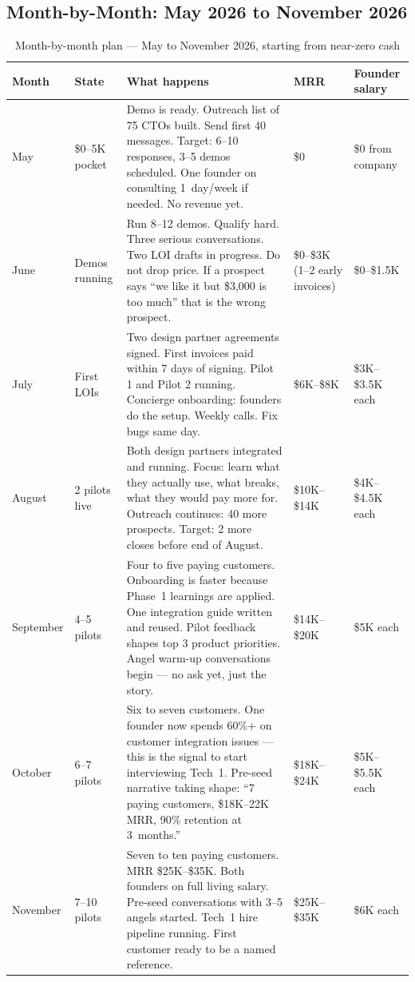 \subsection*{Month-by-Month: May 2026 to November 2026}

\begin{table}[H]
\centering
\renewcommand{\arraystretch}{1.7}
\begin{tabularx}{\textwidth}{@{}llXll@{}}
\toprule
\textbf{Month} & \textbf{State} & \textbf{What happens} &
\textbf{MRR} & \textbf{Founder salary} \\
\midrule
May & \$0--5K pocket & Demo is ready. Outreach list of 75 CTOs built.
  Send first 40 messages. Target: 6--10 responses, 3--5 demos
  scheduled. One founder on consulting 1~day/week if needed.
  No revenue yet. & \$0 & \$0 from company \\
\midrule
June & Demos running & Run 8--12 demos. Qualify hard. Three serious
  conversations. Two LOI drafts in progress. Do not drop price.
  If a prospect says ``we like it but \$3,000 is too much''
  that is the wrong prospect. & \$0--\$3K
  (1--2 early invoices) & \$0--\$1.5K \\
\midrule
July & First LOIs & Two design partner agreements signed. First
  invoices paid within 7 days of signing. Pilot 1 and Pilot 2
  running. Concierge onboarding: founders do the setup. Weekly
  calls. Fix bugs same day. & \$6K--\$8K & \$3K--\$3.5K each \\
\midrule
August & 2 pilots live & Both design partners integrated and running.
  Focus: learn what they actually use, what breaks, what they
  would pay more for. Outreach continues: 40 more prospects.
  Target: 2 more closes before end of August. & \$10K--\$14K &
  \$4K--\$4.5K each \\
\midrule
September & 4--5 pilots & Four to five paying customers. Onboarding
  is faster because Phase~1 learnings are applied. One integration
  guide written and reused. Pilot feedback shapes top 3 product
  priorities. Angel warm-up conversations begin --- no ask yet,
  just the story. & \$14K--\$20K & \$5K each \\
\midrule
October & 6--7 pilots & Six to seven customers. One founder now spends
  60\%+ on customer integration issues --- this is the signal to
  start interviewing Tech~1. Pre-seed narrative taking shape:
  ``7 paying customers, \$18K--22K MRR, 90\% retention at
  3~months.'' & \$18K--\$24K & \$5K--\$5.5K each \\
\midrule
November & 7--10 pilots & Seven to ten paying customers. MRR
  \$25K--\$35K. Both founders on full living salary. Pre-seed
  conversations with 3--5 angels started. Tech~1 hire pipeline
  running. First customer ready to be a named reference. &
  \$25K--\$35K & \$6K each \\
\bottomrule
\end{tabularx}
\caption{Month-by-month plan --- May to November 2026, starting from near-zero cash}
\end{table}

